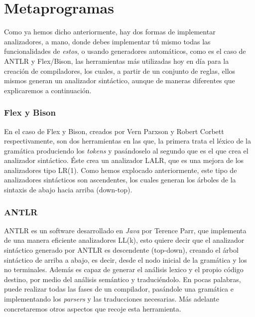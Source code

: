 \documentclass{article}
\begin{document}
    \section{Metaprogramas}

    Como ya hemos dicho anteriormente, hay dos formas de implementar analizadores, a mano, donde debes implementar tú mismo
    todas las funcionalidades de \textit{estos}, o usando generadores automáticos, como es el caso de ANTLR y Flex/Bison, las herramientas
    más utilizadas hoy en día para la creación de compiladores, los cuales,
    a partir de un conjunto de reglas, ellos mismos generan un analizador sintáctico, aunque de maneras diferentes que
    explicaremos a continuación.

    \subsubsection{Flex\cite{flex} y Bison\cite{bison}}

    En el caso de Flex y Bison, creados por Vern Parxson y Robert Corbett respectivamente, son dos herramientas en las que,
    la primera trata el léxico de la gramática produciendo los \textit{tokens} y pasándoselo al segundo que es el que crea el analizador
    sintáctico. Éste crea un analizador LALR, que es una mejora de los analizadores tipo LR(1). Como hemos explocado anteriormente,
    este tipo de analizadores sintácticos son ascendentes, los cuales generan los árboles de la sintaxis de abajo hacia arriba
    (down-top).

    \subsubsection{ANTLR}

    ANTLR\cite{antlr4} es un software desarrollado en \textit{Java} por Terence Parr, que implementa de una manera eficiente analizadores LL(k),
    esto quiere decir que el analizador sintáctico generado por ANTLR es descendente (top-down), creando el árbol sintáctico
    de arriba a abajo, es decir, desde el nodo inicial de la gramática y los no terminales. Además es capaz de generar el
    análisis lexico y el propio código destino, por medio del análisis semántico y traduciéndolo. En pocas palabras, puede
    realizar todas las fases de un compilador, pasándole una gramática e implementando los \textit{parsers} y las traducciones
    necesarias. Más adelante concretaremos otros aspectos que recoje esta herramienta.
\end{document}
